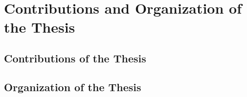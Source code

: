 
\section{Contributions and Organization of the Thesis}

\subsection{Contributions  of the Thesis}

\subsection{Organization of the Thesis}